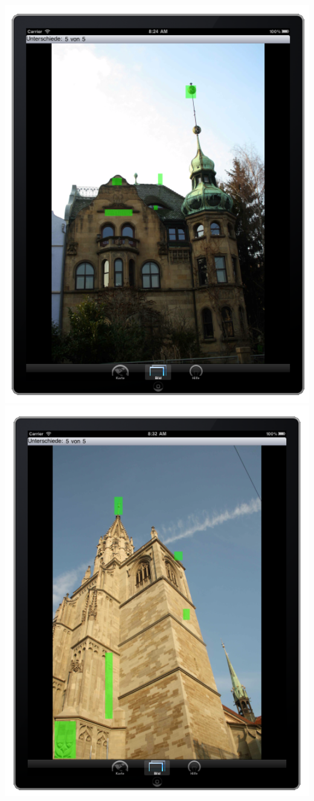   \includegraphics[width=1.0\textwidth]{bilder/loesung3.png}
  \includegraphics[width=1.0\textwidth]{bilder/loesung4.png}
